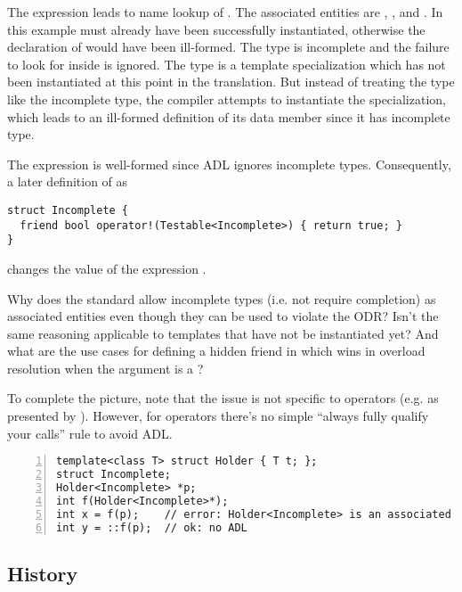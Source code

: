 The expression  leads to name lookup of . The associated 
entities are , , and 
.
In this example  must already have been successfully 
instantiated, otherwise the declaration of  would have been ill-formed.
The type  is incomplete and the failure to look for  
inside  is ignored.
The type  is a template specialization which has not been 
instantiated at this point in the translation. But instead of treating the type like the 
incomplete  type, the compiler attempts to instantiate the 
specialization, which leads to an ill-formed definition of its data member since it has 
incomplete type.

The expression  is well-formed since ADL ignores incomplete types. Consequently, 
a later definition of  as
\medskip\begin{lstlisting}[style=Vc]
struct Incomplete {
  friend bool operator!(Testable<Incomplete>) { return true; }
}
\end{lstlisting}
changes the value of the expression .

Why does the standard allow incomplete types (i.e. not require completion) as associated 
entities even though they can be used to violate the ODR? Isn't the same reasoning 
applicable to templates that have not be instantiated yet? And what are the use cases for 
defining a hidden friend in  which wins in overload resolution when 
the argument is a ?

To complete the picture, note that the issue is not specific to operators (e.g. 
 as presented by \textcite{P2538R0}). However, for operators there's no 
simple “always fully qualify your calls” rule to avoid ADL.

\begin{lstlisting}[style=Vc,numbers=left,float,label=lst:example2,caption={
Minimal example triggering ill-formed instantiation
}]
template<class T> struct Holder { T t; };
struct Incomplete;
Holder<Incomplete> *p;
int f(Holder<Incomplete>*);
int x = f(p);    // error: Holder<Incomplete> is an associated entity
int y = ::f(p);  // ok: no ADL
\end{lstlisting}

\subsection{History}

